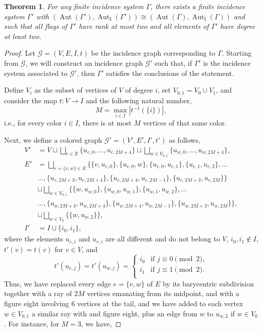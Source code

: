 \documentclass[10pt,a4paper]{amsart}
\newtheorem{theorem}{Theorem}
\newcommand{\Aut}{\operatorname{Aut}}
\newcommand{\AutI}{\Aut_{\text{I}}}
\begin{document}
\begin{theorem}\label{thm:improving incidence system}
For any finite incidence system $\Gamma$, there exists a finite incidence system $\Gamma'$ with $(\Aut(\Gamma'),\AutI(\Gamma'))\cong (\Aut(\Gamma),\AutI(\Gamma))$ and such that all flags of $\Gamma'$ have rank at most two and all elements of $\Gamma'$ have degree at least two.
\end{theorem}

\begin{proof}
Let $\mathcal{G}=(V,E,I,t)$  be the incidence graph corresponding to $\Gamma$. Starting from $\mathcal{G}$, we will construct an incidence graph $\mathcal{G}'$ such that, if $\Gamma'$ is the incidence system associated to $\mathcal{G}'$, then $\Gamma'$ satisfies the conclusions of the statement.

Define $V_i$ as the subset of vertices of $V$ of degree $i$, set $V_{0,1}=V_0\cup V_1$, and consider the map $t\colon V\to I$ and the following natural number,
\[
M=\max_{i\in I}{|t^{-1}(\{i\})|},
\]
i.e., for every color $i\in I$, there is at most $M$ vertices of that same color. 

Next, we define a colored graph $\mathcal{G}'=(V',E',I',t')$ as follows,
\begin{align*}
V'&=V\sqcup \bigsqcup_{e\in E} \{u_{e,0},\ldots,u_{e,{2M+4}}\}\sqcup \bigsqcup_{w\in V_{0,1}} \{u_{w,0},\ldots,u_{w,{2M+4}}\},\\
E'&=\bigsqcup_{e=\{v,w\}\in E}\big\{\{v,u_{e,0}\},\{u_{e,0},w\},\{u_{e,0},u_{e,1}\},\{u_{e,1},u_{e,2}\},\ldots\\
&\ldots,\{u_{e,2M+3},u_{e,2M+4}\},\{u_{e,2M+4},u_{e,2M-1}\},\{u_{e,2M+3},u_{e,2M}\}\big\}\\
&\sqcup \bigsqcup_{w\in V_{0,1}} \big\{\{w,u_{w,0}\},\{u_{w,0},u_{w,1}\},\{u_{w,1},u_{w,2}\},\ldots\\
&\ldots,\{u_{w,2M+3},u_{w,2M+4}\},\{u_{w,2M+4},u_{w,2M-1}\},\{u_{w,2M+3},u_{w,2M}\}\big\},\\
&\sqcup \bigsqcup_{w\in V_0} \big\{\{w,u_{w,2}\}\big\},\\
I'&=I\sqcup \{i_0,i_1\},
\end{align*}
where the elements $u_{e,i}$ and $u_{v,i}$ are all different and do not belong to $V$, $i_0,i_1\notin I$, $t'(v)=t(v)$ for $v\in V$, and 
\[
t'(u_{e,j})=t'(u_{w,j})=\begin{cases} i_0&\text{if $j\equiv 0\pmod 2$},\\
i_1&\text{if $j\equiv 1\pmod 2$.}\\
\end{cases}
\]
Thus, we have replaced every edge $e=\{v,w\}$ of $E$ by its barycentric subdivision together with a ray of $2M$ vertices emanating from its midpoint, and with a figure eight involving $6$ vertices at the tail, and we have added to each vertex $w\in V_{0,1}$  a similar ray with and figure eight, plus an edge from $w$ to $u_{w,2}$ if $w\in V_0$. For instance, for $M=3$, we have, 
    

\end{proof}
\end{document}
